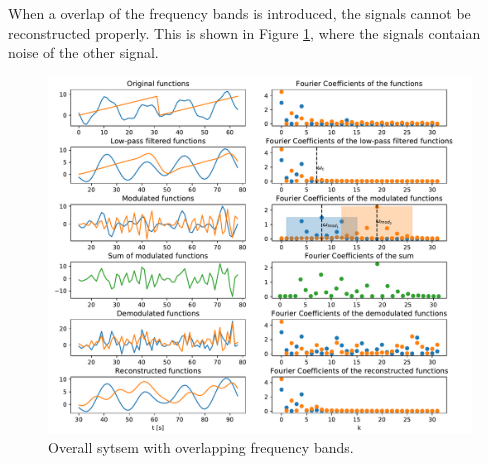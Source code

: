 \documentclass{article}
\begin{document}
When a overlap of the frequency bands is introduced, the signals cannot be reconstructed properly.
This is shown in Figure \ref{fig:overlap}, where the signals contaian noise of the other signal.
\begin{figure}[h!]
    \centering
    \includegraphics[width=\textwidth]{figures/overall_overlapping.pdf}
    \caption{Overall sytsem with overlapping frequency bands.}
    \label{fig:overlap}
\end{figure}
\end{document}
